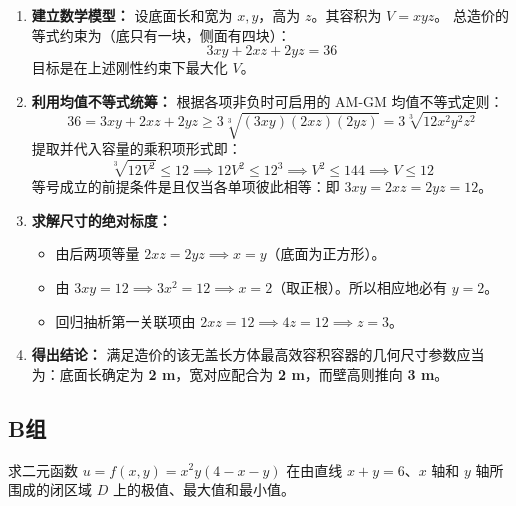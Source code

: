 \documentclass[lang=cn,11pt]{elegantbook}
\begin{document}
\begin{solution}
\begin{enumerate}
    \item \textbf{建立数学模型：}
    设底面长和宽为 $x, y$，高为 $z$。其容积为 $V = xyz$。
    总造价的等式约束为（底只有一块，侧面有四块）：
    \[
    3xy + 2xz + 2yz = 36
    \]
    目标是在上述刚性约束下最大化 $V$。
    
    \item \textbf{利用均值不等式统筹：}
    根据各项非负时可启用的 AM-GM 均值不等式定则：
    \[
    36 = 3xy + 2xz + 2yz \ge 3 \sqrt[3]{(3xy)(2xz)(2yz)} = 3 \sqrt[3]{12 x^2 y^2 z^2}
    \]
    提取并代入容量的乘积项形式即：
    \[
    \sqrt[3]{12 V^2} \le 12 \implies 12 V^2 \le 12^3 \implies V^2 \le 144 \implies V \le 12
    \]
    等号成立的前提条件是且仅当各单项彼此相等：即 $3xy = 2xz = 2yz = 12$。
    
    \item \textbf{求解尺寸的绝对标度：}
    \begin{itemize}
        \item 由后两项等量 $2xz = 2yz \implies x=y$（底面为正方形）。
        \item 由 $3xy=12 \implies 3x^2=12 \implies x=2$（取正根）。所以相应地必有 $y=2$。
        \item 回归抽析第一关联项由 $2xz=12 \implies 4z=12 \implies z=3$。
    \end{itemize}
    
    \item \textbf{得出结论：}
    满足造价的该无盖长方体最高效容积容器的几何尺寸参数应当为：底面长确定为 \textbf{2 m}，宽对应配合为 \textbf{2 m}，而壁高则推向 \textbf{3 m}。
\end{enumerate}
\end{solution}

\subsection{B组}

\begin{exercise}[闭区域最值]
求二元函数 $u=f(x,y)=x^2y(4-x-y)$ 在由直线 $x+y=6$、$x$ 轴和 $y$ 轴所围成的闭区域 $D$ 上的极值、最大值和最小值。
\end{exercise}
\end{document}
